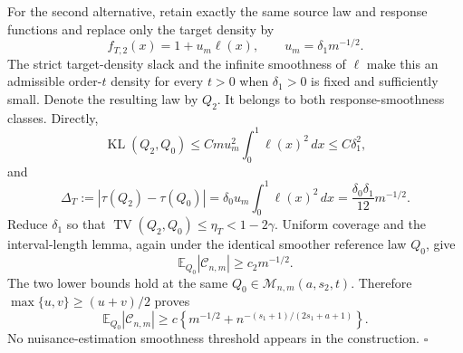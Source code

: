 For the second alternative, retain exactly the same source law and response functions and replace only the target density by
\[
f_{T,2}(x)=1+u_m\ell(x),
\qquad
u_m=\delta_1m^{-1/2}.
\]
The strict target-density slack and the infinite smoothness of \(\ell\) make this an admissible order-\(t\) density for every \(t>0\) when \(\delta_1>0\) is fixed and sufficiently small. Denote the resulting law by \(Q_2\). It belongs to both response-smoothness classes. Directly,
\[
\operatorname{KL}(Q_2,Q_0)
\le Cmu_m^2\int_0^1\ell(x)^2\,dx
\le C\delta_1^2,
\]
and
\[
\Delta_T:=|\tau(Q_2)-\tau(Q_0)|
=\delta_0u_m\int_0^1\ell(x)^2\,dx
=\frac{\delta_0\delta_1}{12}m^{-1/2}.
\]
Reduce \(\delta_1\) so that \(\operatorname{TV}(Q_2,Q_0)\le\eta_T<1-2\gamma\). Uniform coverage and the interval-length lemma, again under the identical smoother reference law \(Q_0\), give
\[
\mathbb E_{Q_0}|\mathcal C_{n,m}|
\ge c_2m^{-1/2}.
\]
The two lower bounds hold at the same \(Q_0\in\mathcal M_{n,m}(a,s_2,t)\). Therefore \(\max\{u,v\}\ge(u+v)/2\) proves
\[
\mathbb E_{Q_0}|\mathcal C_{n,m}|
\ge c\left\{m^{-1/2}+n^{-(s_1+1)/(2s_1+a+1)}\right\}.
\]
No nuisance-estimation smoothness threshold appears in the construction. \(\square\)